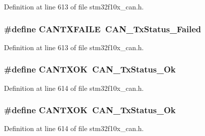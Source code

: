 Definition at line 613 of file stm32f10x\+\_\+can.\+h.

\subsubsection[{\texorpdfstring{C\+A\+N\+T\+X\+F\+A\+I\+LE}{CANTXFAILE}}]{\setlength{\rightskip}{0pt plus 5cm}\#define C\+A\+N\+T\+X\+F\+A\+I\+LE~{\bf C\+A\+N\+\_\+\+Tx\+Status\+\_\+\+Failed}}\hypertarget{group___c_a_n___legacy_gae315f7ee14af20ca8454be9e507873cd}{}\label{group___c_a_n___legacy_gae315f7ee14af20ca8454be9e507873cd}


Definition at line 613 of file stm32f10x\+\_\+can.\+h.

\subsubsection[{\texorpdfstring{C\+A\+N\+T\+X\+OK}{CANTXOK}}]{\setlength{\rightskip}{0pt plus 5cm}\#define C\+A\+N\+T\+X\+OK~{\bf C\+A\+N\+\_\+\+Tx\+Status\+\_\+\+Ok}}\hypertarget{group___c_a_n___legacy_ga288ba42cf1de7572f2fe1378268c9452}{}\label{group___c_a_n___legacy_ga288ba42cf1de7572f2fe1378268c9452}


Definition at line 614 of file stm32f10x\+\_\+can.\+h.

\subsubsection[{\texorpdfstring{C\+A\+N\+T\+X\+OK}{CANTXOK}}]{\setlength{\rightskip}{0pt plus 5cm}\#define C\+A\+N\+T\+X\+OK~{\bf C\+A\+N\+\_\+\+Tx\+Status\+\_\+\+Ok}}\hypertarget{group___c_a_n___legacy_ga288ba42cf1de7572f2fe1378268c9452}{}\label{group___c_a_n___legacy_ga288ba42cf1de7572f2fe1378268c9452}


Definition at line 614 of file stm32f10x\+\_\+can.\+h.

